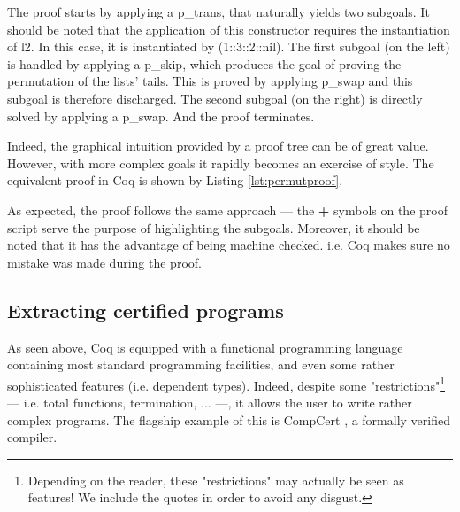 	\noindent The proof starts by applying a \textsf{p\_trans}, that naturally yields two subgoals.	
	It should be noted that the application of this constructor requires the instantiation of \textsf{l2}.
	In this case, it is instantiated by \textsf{(1::3::2::nil)}. The first subgoal (on the left) is handled by applying
	a \textsf{p\_skip}, which produces the goal of proving the permutation of the lists' tails. This is 
	proved by applying \textsf{p\_swap} and this subgoal is therefore discharged. The second subgoal
	(on the right) is directly solved by applying a \textsf{p\_swap}. And the proof terminates.
	
	
	Indeed, the graphical intuition provided by a proof tree can be of great value. However,
	with more complex goals it rapidly becomes an exercise of style. The equivalent proof in
	Coq is shown by Listing \ref{lst:permutproof}.
	
		
		
	\noindent As expected, the proof follows the same approach --- the \textbf{+} symbols
	on the proof script serve the purpose of highlighting the subgoals.
	Moreover, it should be noted that it has the advantage of being machine 
	checked. i.e. Coq makes sure no mistake was made during the proof.
	
	
	
	
	
	
	
\subsection{Extracting certified programs}	
\label{sub:coqextract}	
	

	As seen above, Coq is equipped with a functional programming language 	
	containing most standard programming facilities,  and even 
	some rather sophisticated features (i.e. dependent types). Indeed,
	despite some "restrictions"\footnote{Depending on the reader, these "restrictions" may actually
	be seen as features! We include the quotes in order to avoid any disgust.} 
	--- i.e. total functions, termination, ... ---, it allows the user to write rather complex programs. 
	The flagship example of	this is CompCert \cite{2006-Leroy-compcert}, a formally verified
	compiler.  	
	
